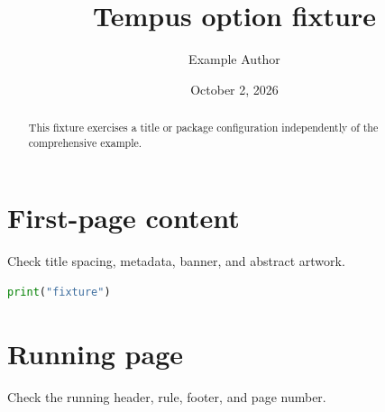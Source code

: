 \documentclass[listings]{tempusreport}
\title{Tempus option fixture}
\author{Example Author}
\date{October 2, 2026}
\begin{document}
\maketitle
\begin{abstract}This fixture exercises a title or package configuration independently of the comprehensive example.\end{abstract}
\section{First-page content}
Check title spacing, metadata, banner, and abstract artwork.

\begin{lstlisting}[language=Python,caption={Fixture listing}]
print("fixture")
\end{lstlisting}

\clearpage\section{Running page}
Check the running header, rule, footer, and page number.
\end{document}
